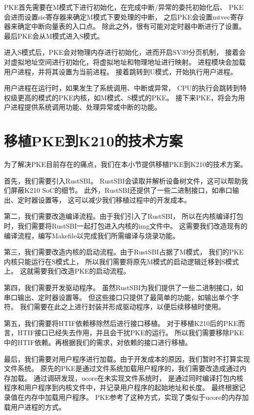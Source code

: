 PKE首先需要在M模式下进行初始化，在完成中断/异常的委托初始化后、
PKE会进而设置sie寄存器来确定M模式下要处理的中断，
之后PKE会设置mtvec寄存器来确定中断向量表的入口点。
除此之外，很有可能对定时器中断进行了设置。
最后PKE会从M模式进入S模式。

进入S模式后，PKE会对物理内存进行初始化，进而开启SV39分页机制，
接着会对虚拟地址空间进行初始化，将虚拟地址和物理地址进行映射。
进程模块会加载用户进程，并将其设置为当前进程。
接着跳转到U模式，开始执行用户进程。

用户进程在运行时，如果发生了系统调用、中断或异常，
CPU的执行会跳转到特权级更高的模式的PKE内核，如M模式、S模式的PKE。
接下来PKE，将会为用户进程提供系统调用功能、处理异常或中断的功能。


\section{移植PKE到K210的技术方案}

为了解决PKE目前存在的痛点，我们在本小节提供移植PKE到K210的技术方案。

首先，我们需要引入RustSBI。
RustSBI会读取并解析设备树文件，这可以帮助我们屏蔽K210 SoC的细节。
此外，RustSBI还提供了一些二进制接口，如串口输出、定时器设置等，
这可以减少我们移植过程中的开发成本。

第二，我们需要改造编译流程。由于我们引入了RustSBI，
所以在内核编译打包时，我们需要将RustSBI一起打包进入内核的img文件中。
这需要我们改造现有的编译流程，编写Makefile以完成我们所需编译与烧录功能。

第三，我们需要改造内核的启动流程。由于RustSBI占据了M模式，
我们的PKE内核只能运行在S模式上，
所以我们需要将原先M模式的启动逻辑迁移到S模式上。
这就需要我们改造PKE的启动流程。

第四，我们需要开发驱动程序。
虽然RustSBI为我们提供了一些二进制接口，如串口输出、定时器设置等。
但这些接口只提供了最简单的功能，如输出单个字符。
我们需要在此之上进行封装并形成驱动程序，以便后续移植时使用。

第五，我们需要将HTIF依赖移除然后进行接口移植。
对于移植K210后的PKE而言，HTIF接口已经失去作用，并且会干扰PKE的运行。
所以我们需要移除PKE中的HTIF依赖。再根据我们的需求，对依赖的接口进行移植。

最后，我们需要对用户程序进行加载。由于开发成本的原因，我们暂时不打算实现文件系统。
原先的PKE是通过文件系统加载用户程序的，我们需要改造成通过内存加载。
通过调研发现，ucore在未实现文件系统时，
是通过同时编译打包内核程序和用户程序到内核文件中，并记录用户程序的起始地址和长度。
最终根据记录值在内存中加载用户程序。
PKE参考了这种方式，实现了类似于ucore的内存加载用户进程的方式。

